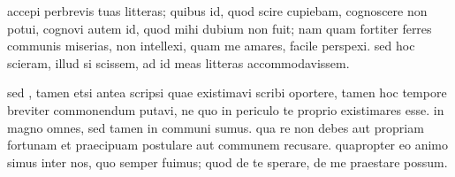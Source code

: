 


 accepi perbrevis tuas litteras; quibus id, quod scire cupiebam, cognoscere non potui, cognovi autem id, quod mihi dubium non fuit; nam quam fortiter ferres communis miserias, non intellexi, quam me amares, facile perspexi. sed hoc scieram, illud si scissem, ad id meas litteras accommodavissem.

 sed , tamen etsi antea scripsi quae existimavi scribi oportere, tamen hoc tempore breviter commonendum putavi, ne quo in periculo te proprio existimares esse. in magno omnes, sed tamen in communi sumus. qua re non debes aut propriam fortunam et praecipuam postulare aut communem recusare. quapropter eo animo simus inter nos, quo semper fuimus; quod de te sperare, de me praestare possum.
